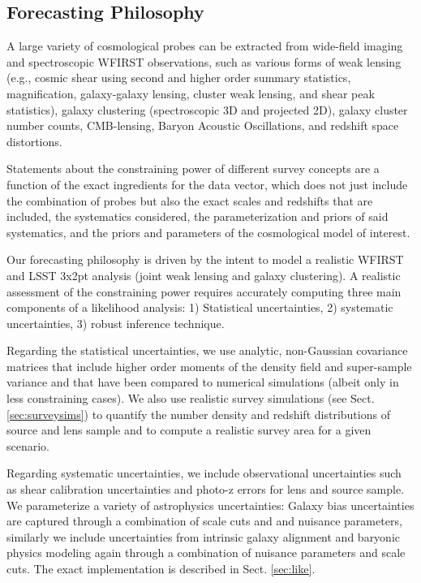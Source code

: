 \documentclass[fleqn,usenatbib,useAMS]{mnras}
\begin{document}
\subsection{Forecasting Philosophy}

A large variety of cosmological probes can be extracted from wide-field imaging and spectroscopic WFIRST observations, such as various forms of weak lensing (e.g., cosmic shear using second and higher order summary statistics, magnification, galaxy-galaxy lensing, cluster weak lensing, and shear peak statistics), galaxy clustering (spectroscopic 3D and projected 2D), galaxy cluster number counts, CMB-lensing, Baryon Acoustic Oscillations, and redshift space distortions. 

Statements about the constraining power of different survey concepts are a function of the exact ingredients for the data vector, which does not just include the combination of probes but also the exact scales and redshifts that are included, the systematics considered, the parameterization and priors of said systematics, and the priors and parameters of the cosmological model of interest. 

Our forecasting philosophy is driven by the intent to model a realistic WFIRST and LSST 3x2pt analysis (joint weak lensing and galaxy clustering). A realistic assessment of the constraining power requires accurately computing three main components of a likelihood analysis: 1) Statistical uncertainties, 2) systematic uncertainties, 3) robust inference technique. 

Regarding the statistical uncertainties, we use analytic, non-Gaussian covariance matrices that include higher order moments of the density field and super-sample variance and that have been compared to numerical simulations (albeit only in less constraining cases). We also use realistic survey simulations (see Sect. \ref{sec:surveysims}) to quantify the number density and redshift distributions of source and lens sample and to compute a realistic survey area for a given scenario.   

Regarding systematic uncertainties, we include observational uncertainties such as shear calibration uncertainties and photo-z errors for lens and source sample. We parameterize a variety of astrophysics uncertainties: Galaxy bias uncertainties are captured through a combination of scale cuts and and nuisance parameters, similarly we include uncertainties from intrinsic galaxy alignment and baryonic physics modeling again through a combination of nuisance parameters and scale cuts. The exact implementation is described in Sect. \ref{sec:like}.
\end{document}

